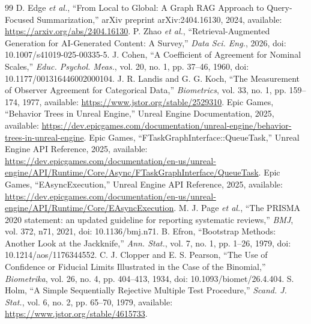 ﻿\documentclass[a4paper,12pt]{article}
\begin{document}
\begin{thebibliography}{99}
 D. Edge \emph{et al.}, ``From Local to Global: A Graph RAG Approach to Query-Focused Summarization,'' arXiv preprint arXiv:2404.16130, 2024, available: \url{https://arxiv.org/abs/2404.16130}.
 P. Zhao \emph{et al.}, ``Retrieval-Augmented Generation for AI-Generated Content: A Survey,'' \emph{Data Sci. Eng.}, 2026, doi: 10.1007/s41019-025-00335-5.
 J. Cohen, ``A Coefficient of Agreement for Nominal Scales,'' \emph{Educ. Psychol. Meas.}, vol. 20, no. 1, pp. 37--46, 1960, doi: 10.1177/001316446002000104.
 J. R. Landis and G. G. Koch, ``The Measurement of Observer Agreement for Categorical Data,'' \emph{Biometrics}, vol. 33, no. 1, pp. 159--174, 1977, available: \url{https://www.jstor.org/stable/2529310}.
 Epic Games, ``Behavior Trees in Unreal Engine,'' Unreal Engine Documentation, 2025, available: \url{https://dev.epicgames.com/documentation/unreal-engine/behavior-trees-in-unreal-engine}.
 Epic Games, ``FTaskGraphInterface::QueueTask,'' Unreal Engine API Reference, 2025, available: \url{https://dev.epicgames.com/documentation/en-us/unreal-engine/API/Runtime/Core/Async/FTaskGraphInterface/QueueTask}.
 Epic Games, ``EAsyncExecution,'' Unreal Engine API Reference, 2025, available: \url{https://dev.epicgames.com/documentation/en-us/unreal-engine/API/Runtime/Core/EAsyncExecution}.
 M. J. Page \emph{et al.}, ``The PRISMA 2020 statement: an updated guideline for reporting systematic reviews,'' \emph{BMJ}, vol. 372, n71, 2021, doi: 10.1136/bmj.n71.
 B. Efron, ``Bootstrap Methods: Another Look at the Jackknife,'' \emph{Ann. Stat.}, vol. 7, no. 1, pp. 1--26, 1979, doi: 10.1214/aos/1176344552.
 C. J. Clopper and E. S. Pearson, ``The Use of Confidence or Fiducial Limits Illustrated in the Case of the Binomial,'' \emph{Biometrika}, vol. 26, no. 4, pp. 404--413, 1934, doi: 10.1093/biomet/26.4.404.
 S. Holm, ``A Simple Sequentially Rejective Multiple Test Procedure,'' \emph{Scand. J. Stat.}, vol. 6, no. 2, pp. 65--70, 1979, available: \url{https://www.jstor.org/stable/4615733}.
\end{thebibliography}
\endgroup
\end{document}

